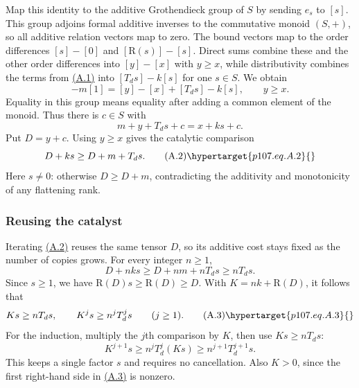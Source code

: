 \begin{amsthmproof}
Map this identity to the additive Grothendieck group of $S$ by sending $e_s$ to $[s]$. This group adjoins formal additive inverses to the commutative monoid $(S,+)$, so all additive relation vectors map to zero. The bound vectors map to the order differences $[s]-[0]$ and $[\mathrm R(s)]-[s]$. Direct sums combine these and the other order differences into $[y]-[x]$ with $y\ge x$, while distributivity combines the terms from \hyperlink{p107.eq.A.1}{(A.1)} into $[T_ds]-k[s]$ for one $s\in S$. We obtain
\[
-m[1]=[y]-[x]+[T_ds]-k[s],\qquad y\ge x.
\]
Equality in this group means equality after adding a common element of the monoid. Thus there is $c\in S$ with
\[
m+y+T_ds+c=x+ks+c.
\]
Put $D=y+c$. Using $y\ge x$ gives the catalytic comparison
\begin{equation}
D+ks\ge D+m+T_ds.
\tag{A.2}\hypertarget{p107.eq.A.2}{}
\end{equation}
Here $s\ne0$: otherwise $D\ge D+m$, contradicting the additivity and monotonicity of any flattening rank.

\subsubsection*{Reusing the catalyst}
Iterating \hyperlink{p107.eq.A.2}{(A.2)} reuses the same tensor $D$, so its additive cost stays fixed as the number of copies grows. For every integer $n\ge1$,
\[
D+nks\ge D+nm+nT_ds\ge nT_ds.
\]
Since $s\ge1$, we have $\mathrm R(D)s\ge\mathrm R(D)\ge D$. With $K=nk+\mathrm R(D)$, it follows that
\begin{equation}
Ks\ge nT_ds,\qquad K^js\ge n^jT_d^js\qquad(j\ge1).
\tag{A.3}\hypertarget{p107.eq.A.3}{}
\end{equation}
For the induction, multiply the $j$th comparison by $K$, then use $Ks\ge nT_ds$:
\[
K^{j+1}s\ge n^jT_d^j(Ks)\ge n^{j+1}T_d^{j+1}s.
\]
This keeps a single factor $s$ and requires no cancellation. Also $K>0$, since the first right-hand side in \hyperlink{p107.eq.A.3}{(A.3)} is nonzero.


\end{amsthmproof}
